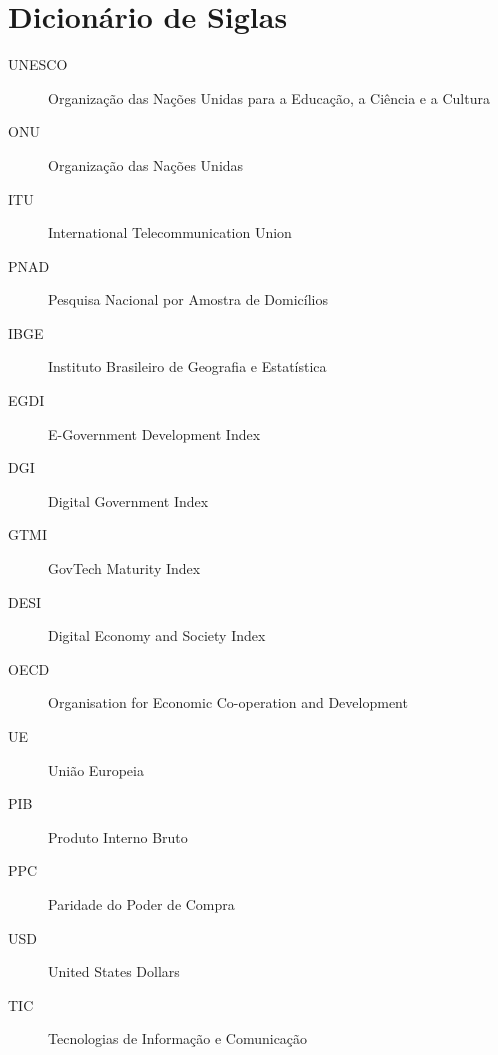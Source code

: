 \section*{Dicionário de Siglas}

\begin{description}
    \item[UNESCO] Organização das Nações Unidas para a Educação, a Ciência e a Cultura
    \item[ONU] Organização das Nações Unidas
    \item[ITU] International Telecommunication Union
    \item[PNAD] Pesquisa Nacional por Amostra de Domicílios
    \item[IBGE] Instituto Brasileiro de Geografia e Estatística
    \item[EGDI] E-Government Development Index
    \item[DGI] Digital Government Index  
    \item[GTMI] GovTech Maturity Index
    \item[DESI] Digital Economy and Society Index 
    \item[OECD] Organisation for Economic Co-operation and Development
    \item[UE] União Europeia 
    \item[PIB] Produto Interno Bruto 
    \item[PPC] Paridade do Poder de Compra 
    \item[USD] United States Dollars
    \item[TIC] Tecnologias de Informação e Comunicação
\end{description}